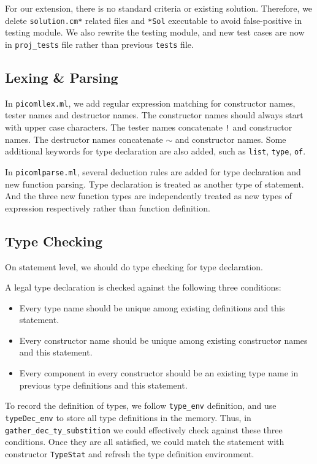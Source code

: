 \documentclass[a4paper,12pt]{article}
\begin{document}
		For our extension, there is no standard criteria or existing solution. Therefore, we delete \texttt{solution.cm*} related files and \texttt{*Sol} executable to avoid false-positive in testing module. We also rewrite the testing module, and new test cases are now in \texttt{proj\_tests} file rather than previous \texttt{tests} file.
	
	\subsection{Lexing \& Parsing}
		In \texttt{picomllex.ml}, we add regular expression matching for constructor names, tester names and destructor names. The constructor names should always start with upper case characters. The tester names concatenate \texttt{!} and constructor names. The destructor names concatenate $\sim$ and constructor names. Some additional keywords for type declaration are also added, such as \texttt{list}, \texttt{type}, \texttt{of}.
		
		In \texttt{picomlparse.ml}, several deduction rules are added for type declaration and new function parsing. Type declaration is treated as another type of statement. And the three new function types are independently treated as new types of expression respectively rather than function definition.
		
	\subsection{Type Checking}
		On statement level, we should do type checking for type declaration.
		
		A legal type declaration is checked against the following three conditions:
		\begin{itemize}
			\item Every type name should be unique among existing definitions and this statement.
			\item Every constructor name should be unique among existing constructor names and this statement.
			\item Every component in every constructor should be an existing type name in previous type definitions and this statement.
		\end{itemize}
	
		To record the definition of types, we follow \texttt{type\_env} definition, and use \texttt{typeDec\_env} to store all type definitions in the memory. Thus, in \texttt{gather\_dec\_ty\_substition} we could effectively check against these three conditions. Once they are all satisfied, we could match the statement with constructor \texttt{TypeStat} and refresh the type definition environment.
		
\end{document}

